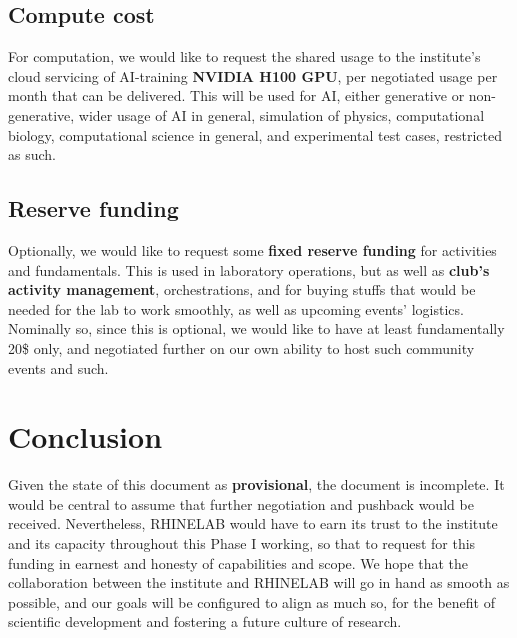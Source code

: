 \documentclass[10pt,a4paper]{article}
\begin{document}
\subsection{Compute cost}

For computation, we would like to request the shared usage to the institute's cloud servicing of AI-training \textbf{NVIDIA H100 GPU}, per negotiated usage per month that can be delivered. This will be used for AI, either generative or non-generative, wider usage of AI in general, simulation of physics, computational biology, computational science in general, and experimental test cases, restricted as such. 

\subsection{Reserve funding}

Optionally, we would like to request some \textbf{fixed reserve funding} for activities and fundamentals. This is used in laboratory operations, but as well as \textbf{club's activity management}, orchestrations, and for buying stuffs that would be needed for the lab to work smoothly, as well as upcoming events' logistics. Nominally so, since this is optional, we would like to have at least fundamentally 20\$ only, and negotiated further on our own ability to host such community events and such. 

\section{Conclusion}

Given the state of this document as \textbf{provisional}, the document is incomplete. It would be central to assume that further negotiation and pushback would be received. Nevertheless, RHINELAB would have to earn its trust to the institute and its capacity throughout this Phase I working, so that to request for this funding in earnest and honesty of capabilities and scope. We hope that the collaboration between the institute and RHINELAB will go in hand as smooth as possible, and our goals will be configured to align as much so, for the benefit of scientific development and fostering a future culture of research. 
\end{document}
